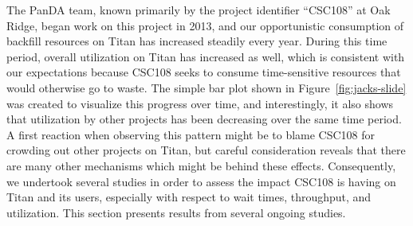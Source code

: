 
%
%





The PanDA team, known primarily by the project identifier ``CSC108'' at Oak
Ridge, began work on this project in 2013, and our opportunistic consumption of
backfill resources on Titan has increased steadily every year. During this time
period, overall utilization on Titan has increased as well, which is consistent
with our expectations because CSC108 seeks to consume time-sensitive resources
that would otherwise go to waste. The simple bar plot shown in
Figure~\ref{fig:jacks-slide} was created to visualize this progress over time,
and interestingly, it also shows that utilization by other projects has been
decreasing over the same time period. A first reaction when observing this
pattern might be to blame CSC108 for crowding out other projects on Titan, but
careful consideration reveals that there are many other mechanisms which might
be behind these effects. Consequently, we undertook several studies in order to
assess the impact CSC108 is having on Titan and its users, especially with
respect to wait times, throughput, and utilization. This section presents
results from several ongoing studies.

